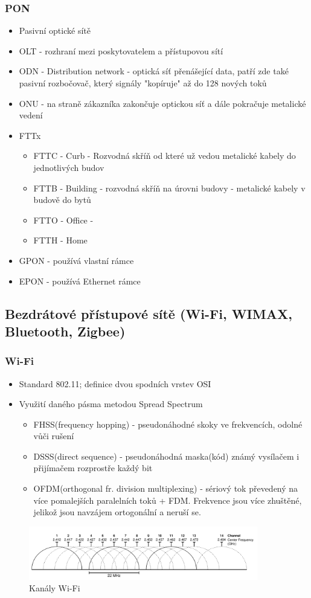 \documentclass[10pt,a4paper]{article}
\begin{document}
\subsubsection{PON}
\begin{itemize}
\item Pasivní optické sítě
\item OLT - rozhraní mezi poskytovatelem a přístupovou sítí
\item ODN - Distribution network - optická síť přenášející data, patří zde také pasivní rozbočovač, který signály "kopíruje" až do 128 nových toků
\item ONU - na straně zákazníka zakončuje optickou síť a dále pokračuje metalické vedení
\item FTTx
\begin{itemize}
\item FTTC - Curb - Rozvodná skříň od které už vedou metalické kabely do jednotlivých budov
\item FTTB - Building - rozvodná skříň na úrovni budovy - metalické kabely v budově do bytů
\item FTTO - Office -
\item FTTH - Home
\end{itemize}
\item GPON - používá vlastní rámce
\item EPON - používá Ethernet rámce
\end{itemize}

\subsection{Bezdrátové přístupové sítě (Wi-Fi, WIMAX, Bluetooth, Zigbee)}
\subsubsection{Wi-Fi}

\begin{itemize}
\item Standard 802.11; definice dvou spodních vrstev OSI
\item Využití daného pásma metodou Spread Spectrum
\begin{itemize}
\item FHSS(frequency hopping) - pseudonáhodné skoky ve frekvencích, odolné vůči rušení
\item DSSS(direct sequence) - pseudonáhodná maska(kód) známý vysílačem i přijímačem rozprostře každý bit
\item OFDM(orthogonal fr. division multiplexing) - sériový tok převedený na více pomalejších paralelních toků + FDM. Frekvence jsou více zhuštěné, jelikož jsou navzájem ortogonální a neruší se.
\end{itemize}
\end{itemize}
\begin{figure}[ht]
    \centering
    \includegraphics[width=10cm]{wifiChannels.pdf}
    \caption{Kanály Wi-Fi}
    \label{fig:Wi-FiChannels}
\end{figure}
\end{document}
